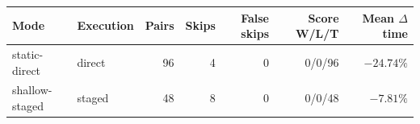 \begin{tabular}{llrrrrr}
\toprule
Mode & Execution & Pairs & Skips & False skips & Score W/L/T & Mean $\Delta$ time \\
\midrule
static-direct & direct & 96 & 4 & 0 & 0/0/96 & $-24.74\%$ \\
shallow-staged & staged & 48 & 8 & 0 & 0/0/48 & $-7.81\%$ \\
\bottomrule
\end{tabular}
